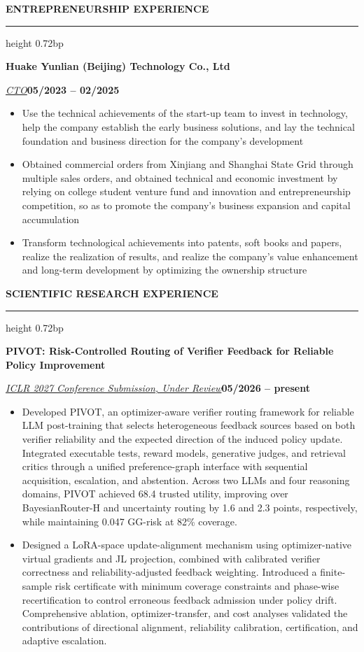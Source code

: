\documentclass[10pt,a4paper]{article}
\newcommand{\sectionrule}[1]{%
  \par\vspace{1.80bp}\noindent\textbf{#1}\par\vspace{2.62bp}%
  \hrule height 0.72bp\vspace{1.80bp}%
}
\let\compactsectionrule\sectionrule
\newcommand{\entrycompany}[2]{%
  \par\vspace{0.80bp}\noindent\textbf{#1}\hfill\textbf{#2}\par\vspace{0.50bp}%
}
\let\jobcompany\entrycompany
\newcommand{\titleline}[1]{\par\vspace{0.80bp}\noindent\textbf{#1}\par\vspace{0.50bp}}
\newcommand{\metaline}[2]{%
  \par\noindent\uline{\textit{#1}}\hfill\textbf{#2}\par\vspace{0.50bp}%
}
\let\roleline\metaline
\let\venueline\metaline
\newenvironment{cvitems}{%
  \begin{itemize}[leftmargin=14.20bp,labelwidth=4.20bp,labelsep=10.00bp,align=left,
    topsep=0bp,itemsep=0bp,parsep=0bp,partopsep=0bp,label={\textbullet}]
}{\end{itemize}}
\begin{document}
\sectionrule{ENTREPRENEURSHIP EXPERIENCE}
\jobcompany{Huake Yunlian (Beijing) Technology Co., Ltd}{}
\roleline{CTO}{05/2023 -- 02/2025}
\begin{cvitems}
\item Use the technical achievements of the start-up team to invest in technology, help the company establish the early business solutions, and lay the technical foundation and business direction for the company's development
\item Obtained commercial orders from Xinjiang and Shanghai State Grid through multiple sales orders, and obtained technical and economic investment by relying on college student venture fund and innovation and entrepreneurship competition, so as to promote the company's business expansion and capital accumulation
\item Transform technological achievements into patents, soft books and papers, realize the realization of results, and realize the company's value enhancement and long-term development by optimizing the ownership structure
\end{cvitems}

\compactsectionrule{SCIENTIFIC RESEARCH EXPERIENCE}
\titleline{PIVOT: Risk-Controlled Routing of Verifier Feedback for Reliable Policy Improvement}
\venueline{ICLR 2027 Conference Submission, Under Review}{05/2026 -- present}
\begin{cvitems}
\item Developed PIVOT, an optimizer-aware verifier routing framework for reliable LLM post-training that selects heterogeneous feedback sources based on both verifier reliability and the expected direction of the induced policy update. Integrated executable tests, reward models, generative judges, and retrieval critics through a unified preference-graph interface with sequential acquisition, escalation, and abstention. Across two LLMs and four reasoning domains, PIVOT achieved 68.4 trusted utility, improving over BayesianRouter-H and uncertainty routing by 1.6 and 2.3 points, respectively, while maintaining 0.047 GG-risk at 82\% coverage.
\item Designed a LoRA-space update-alignment mechanism using optimizer-native virtual gradients and JL projection, combined with calibrated verifier correctness and reliability-adjusted feedback weighting. Introduced a finite-sample risk certificate with minimum coverage constraints and phase-wise recertification to control erroneous feedback admission under policy drift. Comprehensive ablation, optimizer-transfer, and cost analyses validated the contributions of directional alignment, reliability calibration, certification, and adaptive escalation.
\end{cvitems}
\end{document}
